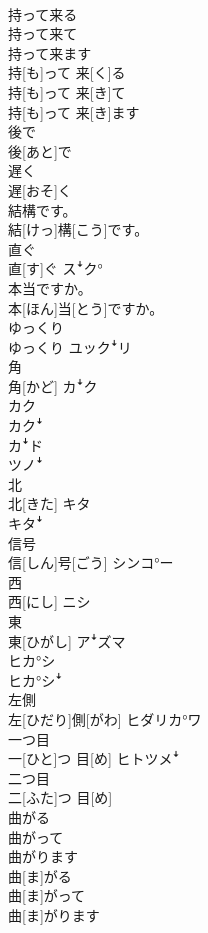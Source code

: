 \documentclass[8pt]{extreport}
\begin{document}
\begin{CJK}{UTF8}{min}
\\	持って来る 
\\	持って来て 
\\	持って来ます	
\\	持[も]って 来[く]る 
\\	持[も]って 来[き]て 
\\	持[も]って 来[き]ます	
\\	後で	
\\	後[あと]で	
\\	遅く	
\\	遅[おそ]く	
\\	結構です。	
\\	結[けっ]構[こう]です。	
\\	直ぐ	
\\	直[す]ぐ	スꜜク°
\\	本当ですか。	
\\	本[ほん]当[とう]ですか。	
\\	ゆっくり	
\\	ゆっくり	ユックꜜリ
\\	角	
\\	角[かど]	カꜜク 
\\	カク 
\\	カクꜜ 
\\	カꜜド 
\\	ツノꜜ
\\	北	
\\	北[きた]	キタ 
\\	キタꜜ
\\	信号	
\\	信[しん]号[ごう]	シンコ°ー
\\	西	
\\	西[にし]	ニシ
\\	東	
\\	東[ひがし]	アꜜズマ 
\\	ヒカ°シ 
\\	ヒカ°シꜜ
\\	左側	
\\	左[ひだり]側[がわ]	ヒダリカ°ワ
\\	一つ目	
\\	一[ひと]つ 目[め]	ヒトツメꜜ
\\	二つ目	
\\	二[ふた]つ 目[め]	
\\	曲がる 
\\	曲がって 
\\	曲がります	
\\	曲[ま]がる 
\\	曲[ま]がって 
\\	曲[ま]がります	

\end{CJK}
\end{document}
